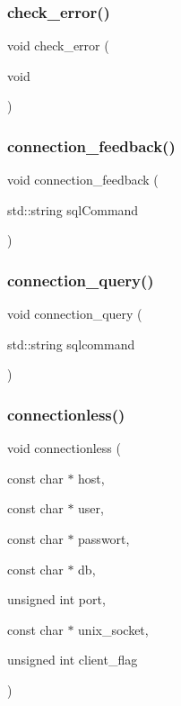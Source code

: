 \mbox{\label{sqllib_8hpp_a33fd832a9e1a27bddb7d9837a2dcf2f1}} 
\subsubsection{check\+\_\+error()}
{\footnotesize\ttfamily void check\+\_\+error (\begin{DoxyParamCaption}\item[{void}]{ }\end{DoxyParamCaption})}

\mbox{\label{sqllib_8hpp_ab12a404eefae07281e8d1273ca3fc447}} 
\subsubsection{connection\+\_\+feedback()}
{\footnotesize\ttfamily void connection\+\_\+feedback (\begin{DoxyParamCaption}\item[{std\+::string}]{sql\+Command }\end{DoxyParamCaption})}

\mbox{\label{sqllib_8hpp_a83d389dd4406da88cf16f7736e012537}} 
\subsubsection{connection\+\_\+query()}
{\footnotesize\ttfamily void connection\+\_\+query (\begin{DoxyParamCaption}\item[{std\+::string}]{sqlcommand }\end{DoxyParamCaption})}

\mbox{\label{sqllib_8hpp_a76ac4f4e873cad05bcaa10a8b7e048ce}} 
\subsubsection{connectionless()}
{\footnotesize\ttfamily void connectionless (\begin{DoxyParamCaption}\item[{const char $\ast$}]{host,  }\item[{const char $\ast$}]{user,  }\item[{const char $\ast$}]{passwort,  }\item[{const char $\ast$}]{db,  }\item[{unsigned int}]{port,  }\item[{const char $\ast$}]{unix\+\_\+socket,  }\item[{unsigned int}]{client\+\_\+flag }\end{DoxyParamCaption})}

